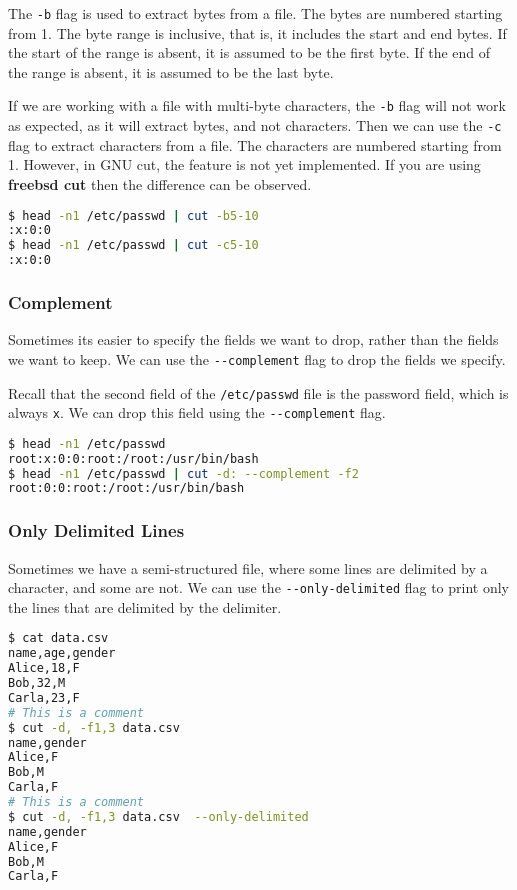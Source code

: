The \lstinline|-b| flag is used to extract bytes from a file. The bytes are numbered starting from 1. The byte range is inclusive, that is, it includes the start and end bytes. If the start of the range is absent, it is assumed to be the first byte. If the end of the range is absent, it is assumed to be the last byte.

If we are working with a file with multi-byte characters, the \lstinline|-b| flag will not work as expected, as it will extract bytes, and not characters.
Then we can use the \lstinline|-c| flag to extract characters from a file. The characters are numbered starting from 1. However, in GNU cut, the feature is not yet implemented. If you are using \textbf{freebsd cut} then the difference can be observed.

\begin{lstlisting}[language=bash]
$ head -n1 /etc/passwd | cut -b5-10
:x:0:0
$ head -n1 /etc/passwd | cut -c5-10
:x:0:0
\end{lstlisting}

\subsubsection{Complement}

Sometimes its easier to specify the fields we want to drop, rather than the fields we want to keep. We can use the \lstinline|--complement| flag to drop the fields we specify.

Recall that the second field of the \lstinline|/etc/passwd| file is the password field, which is always \lstinline|x|. We can drop this field using the \lstinline|--complement| flag.

\begin{lstlisting}[language=bash]
$ head -n1 /etc/passwd
root:x:0:0:root:/root:/usr/bin/bash
$ head -n1 /etc/passwd | cut -d: --complement -f2
root:0:0:root:/root:/usr/bin/bash
\end{lstlisting}

\subsubsection{Only Delimited Lines}

Sometimes we have a semi-structured file, where some lines are delimited by a character, and some are not. We can use the \lstinline|--only-delimited| flag to print only the lines that are delimited by the delimiter.

\begin{lstlisting}[language=bash]
$ cat data.csv
name,age,gender
Alice,18,F
Bob,32,M
Carla,23,F
# This is a comment
$ cut -d, -f1,3 data.csv
name,gender
Alice,F
Bob,M
Carla,F
# This is a comment
$ cut -d, -f1,3 data.csv  --only-delimited
name,gender
Alice,F
Bob,M
Carla,F
\end{lstlisting}

